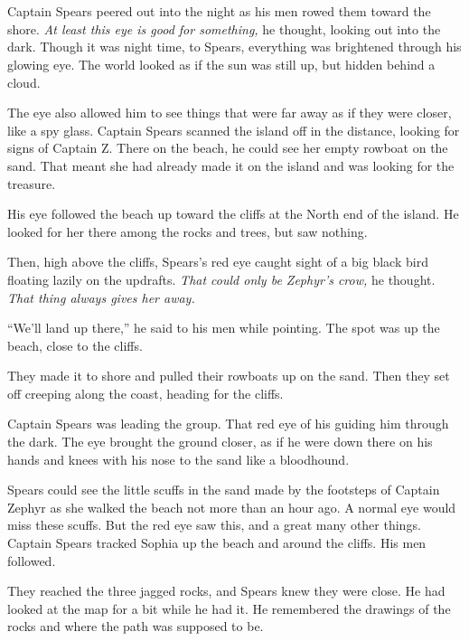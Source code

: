 \documentclass[12pt]{extbook}
\begin{document}
  \section{}\label{section-17}
  
  Captain Spears peered out into the night as his men rowed them toward
  the shore. \emph{At least this eye is good for something,} he thought,
  looking out into the dark. Though it was night time, to Spears,
  everything was brightened through his glowing eye. The world looked as
  if the sun was still up, but hidden behind a cloud.
  
  The eye also allowed him to see things that were far away as if they
  were closer, like a spy glass. Captain Spears scanned the island off in
  the distance, looking for signs of Captain Z. There on the beach, he
  could see her empty rowboat on the sand. That meant she had already made
  it on the island and was looking for the treasure.
  
  His eye followed the beach up toward the cliffs at the North end of the
  island. He looked for her there among the rocks and trees, but saw
  nothing.
  
  Then, high above the cliffs, Spears's red eye caught sight of a big
  black bird floating lazily on the updrafts. \emph{That could only be
  Zephyr's crow,} he thought. \emph{That thing always gives her away.}
  
  \enquote{We'll land up there,} he said to his men while pointing. The
  spot was up the beach, close to the cliffs.
  
  They made it to shore and pulled their rowboats up on the sand. Then
  they set off creeping along the coast, heading for the cliffs.
  
  Captain Spears was leading the group. That red eye of his guiding him
  through the dark. The eye brought the ground closer, as if he were down
  there on his hands and knees with his nose to the sand like a
  bloodhound.
  
  Spears could see the little scuffs in the sand made by the footsteps of
  Captain Zephyr as she walked the beach not more than an hour ago. A
  normal eye would miss these scuffs. But the red eye saw this, and a
  great many other things. Captain Spears tracked Sophia up the beach and
  around the cliffs. His men followed.
  
  They reached the three jagged rocks, and Spears knew they were close. He
  had looked at the map for a bit while he had it. He remembered the
  drawings of the rocks and where the path was supposed to be.
  
\end{document}
